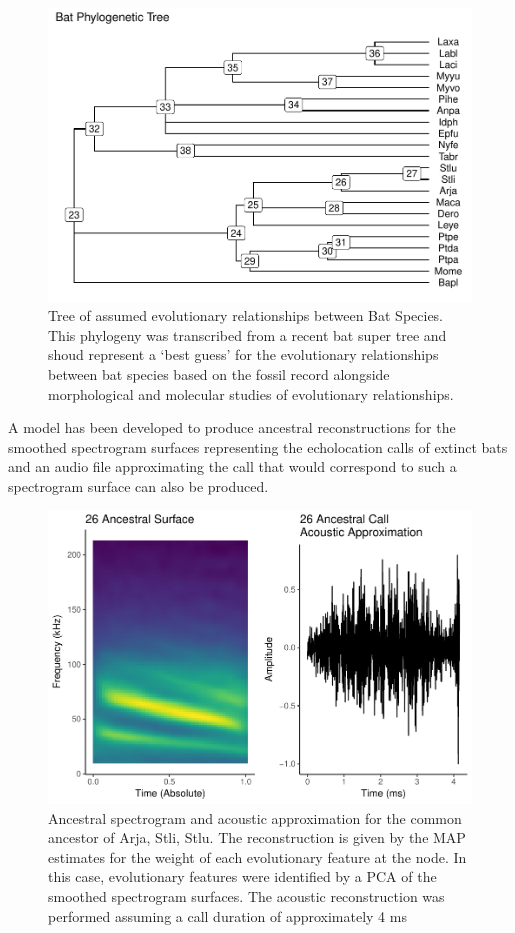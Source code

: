 \documentclass[]{article}
\begin{document}
\begin{figure}
\centering
\includegraphics{for_mark_files/figure-latex/phylogeny figure-1.pdf}
\caption{Tree of assumed evolutionary relationships between Bat Species.
This phylogeny was transcribed from a recent bat super tree and shoud
represent a `best guess' for the evolutionary relationships between bat
species based on the fossil record alongside morphological and molecular
studies of evolutionary relationships.}
\end{figure}

A model has been developed to produce ancestral reconstructions for the
smoothed spectrogram surfaces representing the echolocation calls of
extinct bats and an audio file approximating the call that would
correspond to such a spectrogram surface can also be produced.

\begin{figure}
\centering
\includegraphics{for_mark_files/figure-latex/ancestral audio-1.pdf}
\caption{Ancestral spectrogram and acoustic approximation for the common
ancestor of Arja, Stli, Stlu. The reconstruction is given by the MAP
estimates for the weight of each evolutionary feature at the node. In
this case, evolutionary features were identified by a PCA of the
smoothed spectrogram surfaces. The acoustic reconstruction was performed
assuming a call duration of approximately 4 ms}
\end{figure}
\end{document}
